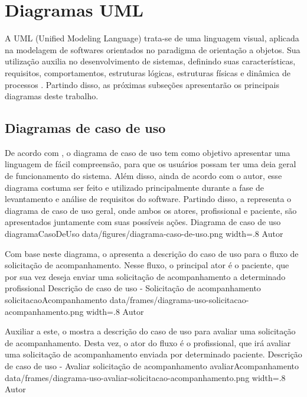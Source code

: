 \section{Diagramas UML}
\label{sec:diagramas}

A UML (Unified Modeling Language) trata-se de uma linguagem visual, aplicada na modelagem de softwares orientados no paradigma de orientação a objetos. Sua utilização auxilia no desenvolvimento de sistemas, definindo suas características, requisitos, comportamentos, estruturas lógicas, estruturas físicas e dinâmica de processos \cite{Guedes2018}. Partindo disso, as próximas subseções apresentarão os principais diagramas deste trabalho.

\subsection{Diagramas de caso de uso}
\label{sec:diagramasDeCasoDeUso}
De acordo com , o diagrama de caso de uso tem como objetivo apresentar uma linguagem de fácil compreensão, para que os usuários possam ter uma deia geral de funcionamento do sistema. Além disso, ainda de acordo com o autor, esse diagrama costuma ser feito e utilizado principalmente durante a fase de levantamento e análise de requisitos do software. Partindo disso, a  representa o diagrama de caso de uso geral, onde ambos os atores, profissional e paciente, são apresentados juntamente com suas possíveis ações.
\image
    {Diagrama de caso de uso}
    {diagramaCasoDeUso}
    {data/figures/diagrama-caso-de-uso.png}
    {width=.8\textwidth}
    {Autor}

Com base neste diagrama, o  apresenta a descrição do caso de uso para o fluxo de solicitação de acompanhamento. Nesse fluxo, o principal ator é o paciente, que por sua vez deseja enviar uma solicitação de acompanhamento a determinado profissional
\customFrame
    {Descrição de caso de uso - Solicitação de acompanhamento}
    {solicitacaoAcompanhamento}
    {data/frames/diagrama-uso-solicitacao-acompanhamento.png}
    {width=.8\textwidth}
    {Autor}

Auxiliar a este, o  mostra a descrição do caso de uso para avaliar uma solicitação de acompanhamento. Desta vez, o ator do fluxo é o profissional, que irá avaliar uma solicitação de acompanhamento enviada por determinado paciente.
\customFrame
    {Descrição de caso de uso - Avaliar solicitação de acompanhamento}
    {avaliarAcompanhamento}
    {data/frames/diagrama-uso-avaliar-solicitacao-acompanhamento.png}
    {width=.8\textwidth}
    {Autor}

